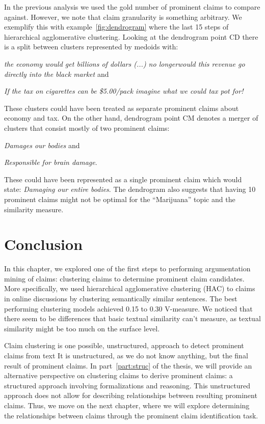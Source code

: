 In the previous analysis we used the gold number of prominent claims to compare
against. However, we note that claim granularity is something arbitrary. 
We exemplify this with example~\ref{fig:dendrogram} where the last 15 steps of
hierarchical agglomerative clustering. 
Looking at the dendrogram point CD there is a split between clusters represented by medoids with: 
\begin{enumerate*}[label=\arabic*)]
\item \textit{the economy would get billions of dollars (...) no longerwould this revenue
go directly into the black market} and 
\item \textit{If the tax on cigarettes can
be \$5.00/pack imagine what we could tax pot for!}
\end{enumerate*}
These clusters could have been treated as separate prominent claims about
economy and tax. 
On the other hand, dendrogram point CM denotes a merger of clusters that
consist mostly of two prominent claims: 
\begin{enumerate*}[label=\arabic*)]
\item \textit{Damages our bodies} and 
\item \textit{Responsible for brain damage}.
\end{enumerate*}
These could have been represented as a single prominent claim which would state: 
\textit{Damaging our entire bodies}. 
The dendrogram also suggests that having 10 prominent claims might not be optimal 
for the ``Marijuana'' topic and the similarity measure. 

\section{Conclusion}
\label{sec:argclu_conclusion}

In this chapter, we explored one of the first steps to performing argumentation
mining of claims: clustering claims to determine prominent claim candidates.
More specifically, we used hierarchical agglomerative clustering (HAC) to
claims in online discussions by clustering semantically similar sentences.  The
best performing clustering models achieved 0.15 to 0.30 V-measure. 
We noticed that  there seem to be differences that basic textual similarity
can't measure, as textual similarity might be too much on the surface level. 

Claim clustering is one possible, unstructured, approach to 
detect prominent claims from text  
It is unstructured, as we do not know anything, but the final result of
prominent claims. In part~\ref{part:struc} of the thesis, we will provide an
alternative perspective on clustering claims to derive prominent claims: a
structured approach involving formalizations and reasoning. This unstructured
approach does not allow for describing relationships between resulting
prominent claims. Thus, we move on the next chapter, where we will 
explore determining the relationships between claims through the 
prominent claim identification task. 

